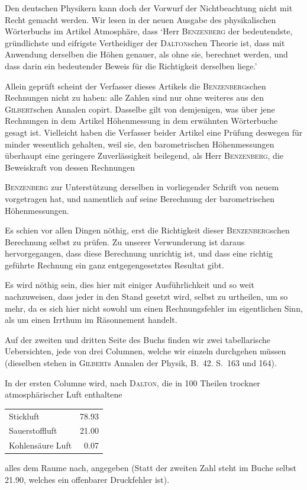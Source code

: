 \documentclass[12pt,a4paper]{article}
\begin{document}
Den deutschen Physikern kann doch der Vorwurf der Nichtbeachtung nicht mit Recht gemacht werden. Wir lesen in der neuen Ausgabe des physikalischen W\"orterbuchs im Artikel Atmosph\"are, dass `Herr \textsc{Benzenberg} der bedeutendste, gr\"undlichste und eifrigste Vertheidiger der \textsc{Dalton}schen Theorie ist, dass mit Anwendung derselben die H\"ohen genauer, als ohne sie, berechnet werden, und dass darin ein bedeutender Beweis f\"ur die Richtigkeit derselben liege.'

Allein gepr\"uft scheint der Verfasser dieses Artikels die \textsc{Benzenberg}schen Rechnungen nicht zu haben: alle Zahlen sind nur ohne weiteres aus den \textsc{Gilbert}schen Annalen copirt. Dasselbe gilt von demjenigen, was \"uber jene Rechnungen in dem Artikel H\"ohenmessung in dem erw\"ahnten W\"orterbuche gesagt ist. Vielleicht haben die Verfasser beider Artikel eine Pr\"ufung deswegen f\"ur minder wesentlich gehalten, weil sie, den barometrischen H\"ohenmessungen \"uberhaupt eine geringere Zuverl\"assigkeit beilegend, als Herr \textsc{Benzenberg}, die Beweiskraft von dessen Rechnungen

\newpage
\noindent
\textsc{Benzenberg} zur Unterst\"utzung derselben in vorliegender Schrift von neuem vorgetragen hat, und namentlich auf seine Berechnung der barometrischen H\"ohenmessungen.

Es schien vor allen Dingen n\"othig, erst die Richtigkeit dieser \textsc{Benzenberg}schen Berechnung selbst zu pr\"ufen. Zu unserer Verwunderung ist daraus hervorgegangen, dass diese Berechnung unrichtig ist, und dass eine richtig gef\"uhrte Rechnung ein ganz entgegengesetztes Resultat gibt.

Es wird n\"othig sein, dies hier mit einiger Ausf\"uhrlichkeit und so weit nachzuweisen, dass jeder in den Stand gesetzt wird, selbst zu urtheilen, um so mehr, da es sich hier nicht sowohl um einen Rechnungsfehler im eigentlichen Sinn, als um einen Irrthum im R\"asonnement handelt.

Auf der zweiten und dritten Seite des Buchs finden wir zwei tabellarische Uebersichten, jede von drei Columnen, welche wir einzeln durchgehen m\"ussen (dieselben stehen in \textsc{Gilbert}s Annalen der Physik, B.~42. S.~163 und 164).

In der ersten Columne wird, nach \textsc{Dalton}, die in 100 Theilen trockner atmosph\"arischer Luft enthaltene
\begin{center}
\begin{tabular}{l@{\ \ldots\ldots\ }r@{\ Theilen}}
Stickluft & 78.93 \\
Sauerstoffluft & 21.00 \\
Kohlens\"aure Luft & 0.07 \\
\end{tabular}
\end{center}
alles dem Raume nach, angegeben (Statt der zweiten Zahl steht im Buche selbst 21.90, welches ein offenbarer Druckfehler ist).
\end{document}

